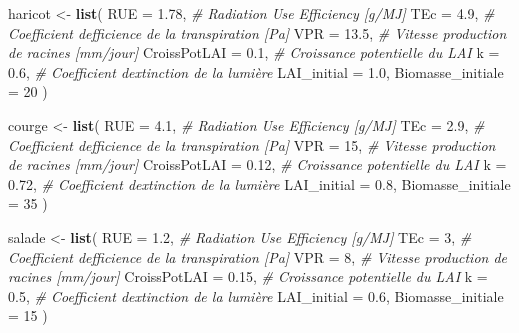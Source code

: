 \documentclass[
]{article}
\newenvironment{Shaded}{\begin{snugshade}}{\end{snugshade}}
\newcommand{\AttributeTok}[1]{\textcolor[rgb]{0.13,0.29,0.53}{#1}}
\newcommand{\CommentTok}[1]{\textcolor[rgb]{0.56,0.35,0.01}{\textit{#1}}}
\newcommand{\DecValTok}[1]{\textcolor[rgb]{0.00,0.00,0.81}{#1}}
\newcommand{\FloatTok}[1]{\textcolor[rgb]{0.00,0.00,0.81}{#1}}
\newcommand{\FunctionTok}[1]{\textcolor[rgb]{0.13,0.29,0.53}{\textbf{#1}}}
\newcommand{\NormalTok}[1]{#1}
\newcommand{\OtherTok}[1]{\textcolor[rgb]{0.56,0.35,0.01}{#1}}
\begin{document}
\begin{Shaded}
\begin{Highlighting}[]
\NormalTok{haricot }\OtherTok{\textless{}{-}} \FunctionTok{list}\NormalTok{(}
  \AttributeTok{RUE               =} \FloatTok{1.78}\NormalTok{,  }\CommentTok{\# Radiation Use Efficiency [g/MJ]}
  \AttributeTok{TEc               =} \FloatTok{4.9}\NormalTok{,   }\CommentTok{\# Coefficient d\textquotesingle{}efficience de la transpiration [Pa]}
  \AttributeTok{VPR               =} \FloatTok{13.5}\NormalTok{,  }\CommentTok{\# Vitesse production de racines [mm/jour]}
  \AttributeTok{CroissPotLAI      =} \FloatTok{0.1}\NormalTok{,   }\CommentTok{\# Croissance potentielle du LAI }
  \AttributeTok{k                 =} \FloatTok{0.6}\NormalTok{,   }\CommentTok{\# Coefficient d\textquotesingle{}extinction de la lumière}
  \AttributeTok{LAI\_initial       =} \FloatTok{1.0}\NormalTok{,   }
  \AttributeTok{Biomasse\_initiale =} \DecValTok{20}     
\NormalTok{)}

\NormalTok{courge }\OtherTok{\textless{}{-}} \FunctionTok{list}\NormalTok{(}
  \AttributeTok{RUE               =} \FloatTok{4.1}\NormalTok{,   }\CommentTok{\# Radiation Use Efficiency [g/MJ]}
  \AttributeTok{TEc               =} \FloatTok{2.9}\NormalTok{,   }\CommentTok{\# Coefficient d\textquotesingle{}efficience de la transpiration [Pa]}
  \AttributeTok{VPR               =} \DecValTok{15}\NormalTok{,    }\CommentTok{\# Vitesse production de racines [mm/jour]}
  \AttributeTok{CroissPotLAI      =} \FloatTok{0.12}\NormalTok{,  }\CommentTok{\# Croissance potentielle du LAI }
  \AttributeTok{k                 =} \FloatTok{0.72}\NormalTok{,  }\CommentTok{\# Coefficient d\textquotesingle{}extinction de la lumière}
  \AttributeTok{LAI\_initial       =} \FloatTok{0.8}\NormalTok{,   }
  \AttributeTok{Biomasse\_initiale =} \DecValTok{35}
\NormalTok{)}


\NormalTok{salade }\OtherTok{\textless{}{-}} \FunctionTok{list}\NormalTok{(}
  \AttributeTok{RUE               =} \FloatTok{1.2}\NormalTok{,   }\CommentTok{\# Radiation Use Efficiency [g/MJ]}
  \AttributeTok{TEc               =} \DecValTok{3}\NormalTok{,     }\CommentTok{\# Coefficient d\textquotesingle{}efficience de la transpiration [Pa]}
  \AttributeTok{VPR               =} \DecValTok{8}\NormalTok{,     }\CommentTok{\# Vitesse production de racines [mm/jour]}
  \AttributeTok{CroissPotLAI      =} \FloatTok{0.15}\NormalTok{,  }\CommentTok{\# Croissance potentielle du LAI }
  \AttributeTok{k                 =} \FloatTok{0.5}\NormalTok{,   }\CommentTok{\# Coefficient d\textquotesingle{}extinction de la lumière}
  \AttributeTok{LAI\_initial       =} \FloatTok{0.6}\NormalTok{,   }
  \AttributeTok{Biomasse\_initiale =} \DecValTok{15}     
\NormalTok{)}
\end{Highlighting}
\end{Shaded}
\end{document}
